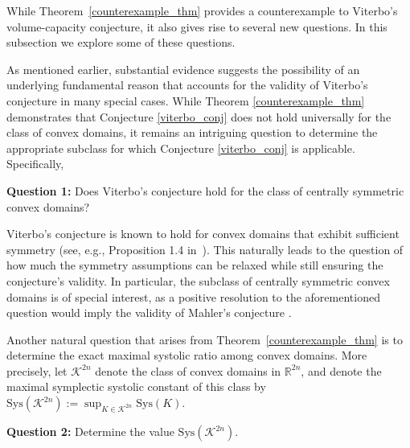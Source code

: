 \documentclass[10pt,a4paper]{article}
\theoremstyle{definition}
\newcommand{\R}{{\mathbb{R}}}
\begin{document}
While Theorem~\ref{counterexample_thm} provides a counterexample to Viterbo's volume-capacity conjecture, it also gives rise to several new questions. In this subsection we explore some 
 of these questions.

\medskip
  


\vskip 3pt 

As mentioned earlier, substantial evidence suggests the possibility of an underlying fundamental reason that accounts for the validity of Viterbo's conjecture in many special cases.
While Theorem \ref{counterexample_thm} demonstrates that Conjecture \ref{viterbo_conj} does not hold universally for the class of convex domains,
it remains an intriguing question to determine
the appropriate subclass for which Conjecture \ref{viterbo_conj} is applicable. Specifically, 

\vskip 3pt
 
 {\bf Question 1:} Does Viterbo's conjecture hold for the class of centrally symmetric convex domains?

\vskip 3pt

Viterbo's conjecture is known to hold for convex domains that exhibit sufficient symmetry (see, e.g., 
Proposition 1.4 in~\cite{gutt-hutchings-ramos}). 
This naturally leads to the question of how much the symmetry assumptions can be relaxed while still ensuring the conjecture's validity. 
In particular, the subclass of centrally symmetric convex domains is of special interest, as a positive resolution to the aforementioned question would  imply the validity of Mahler's conjecture \cite{capacity_mahler}.

\medskip 


\vskip 3pt


Another natural question that arises from Theorem~\ref{counterexample_thm} is to determine the exact maximal systolic ratio among 
convex domains. More precisely, let $\mathcal K^{2n}$ denote the class of convex domains in $\R^{2n}$, and denote the 
maximal symplectic systolic constant of this class by  $ \mathrm{Sys}(\mathcal K^{2n}) := \sup_{K \in \mathcal K^{2n}} \mathrm{Sys}(K). $

\medskip 
 
{\bf Question 2:} Determine the value $\mathrm{Sys}(\mathcal K^{2n})$.


\medskip
\end{document}
